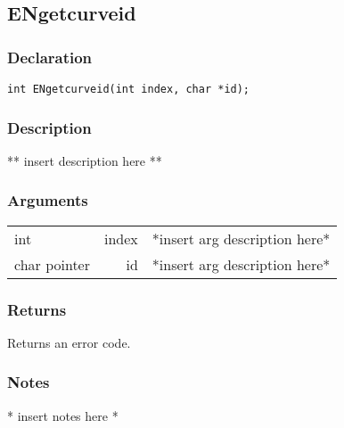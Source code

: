 \subsection{ENgetcurveid}
\subsubsection{Declaration}
\begin{lstlisting}
int ENgetcurveid(int index, char *id);
\end{lstlisting}
\subsubsection{Description}
** insert description here **
\subsubsection{Arguments}
\begin{tabular}{l r p{11cm} }
int&index&*insert arg description here* \\[6pt]
char pointer&id&*insert arg description here* \\[6pt]
\end{tabular}
\subsubsection{Returns}
Returns an error code.
\subsubsection{Notes}
* insert notes here *